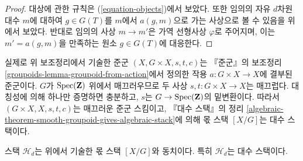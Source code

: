 \begin{proof}
대상에 관한 규칙은 (\ref{equation-objects})에서 보았다.
또한 임의의 자유 $d$차원 대수 $m$에 대하여 $g \in G(T)$를
$m$에서 $a(g, m)$으로 가는 사상으로 볼 수 있음을 위에서 보았다.
반대로 임의의 사상 $m \to m'$은 가역 선형사상 $\varphi$로 주어지며,
이는 $m' = a(g, m)$을 만족하는 원소 $g \in G(T)$에 대응한다.
\end{proof}

\noindent
실제로 위 보조정리에서 기술한 준군 $(X, G \times X, s, t, c)$는
『준군』의 보조정리 \ref{groupoids-lemma-groupoid-from-action}에서
정의한 작용 $a : G \times X \to X$에 결부된 준군이다.
$G$가 $\mathop{\mathrm{Spec}}(\mathbf{Z})$ 위에서 매끄러우므로 두 사상
$s, t : G \times X \to X$는 매끄럽다. 대칭성에 의해 하나만
증명하면 충분하고, $s$는 $G \to \mathop{\mathrm{Spec}}(\mathbf{Z})$의 밑변환이다.
따라서 $(G \times X, X, s, t, c)$는 매끄러운 준군 스킴이고,
『대수 스택』의 정리
\ref{algebraic-theorem-smooth-groupoid-gives-algebraic-stack}에 의해
몫 스택 $[X/G]$는 대수 스택이다.

\begin{proposition}
\label{proposition-finite-hilbert-point}
스택 $\mathcal{H}_d$는 위에서 기술한 몫 스택 $[X/G]$와 동치이다.
특히 $\mathcal{H}_d$는 대수 스택이다.
\end{proposition}

